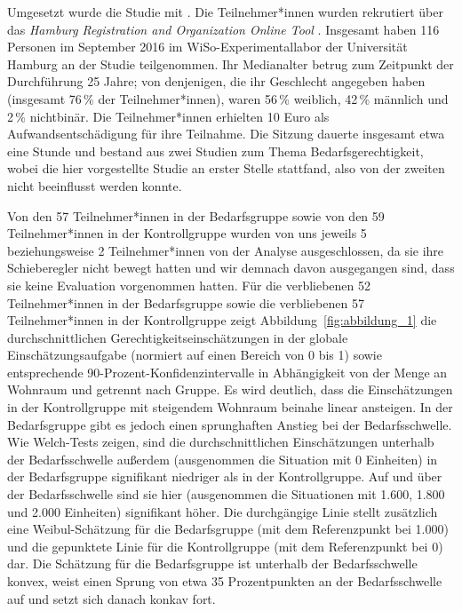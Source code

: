 \documentclass[justified,nobib,nohyper,symmetric,twoside]{tufte-book}
\begin{document}
Umgesetzt wurde die Studie mit \citet{limesurvey_limesurvey_2020}.
Die Teilnehmer*innen wurden rekrutiert über das \textit{Hamburg Registration and Organization Online Tool} \citep{bock_hroot_2014}.
Insgesamt haben 116 Personen im September 2016 im WiSo-Experimentallabor der Universität Hamburg an der Studie teilgenommen.
Ihr Medianalter betrug zum Zeitpunkt der Durchführung 25 Jahre; von denjenigen, die ihr Geschlecht angegeben haben (insgesamt 76\,\% der Teilnehmer*innen), waren 56\,\% weiblich, 42\,\% männlich und 2\,\% nichtbinär.
Die Teilnehmer*innen erhielten 10 Euro als Aufwandsentschädigung für ihre Teilnahme.
Die Sitzung dauerte insgesamt etwa eine Stunde und bestand aus zwei Studien zum Thema Bedarfsgerechtigkeit, wobei die hier vorgestellte Studie an erster Stelle stattfand, also von der zweiten nicht beeinflusst werden konnte.

Von den 57 Teilnehmer*innen in der Bedarfsgruppe sowie von den 59 Teilnehmer*innen in der Kontrollgruppe wurden von uns jeweils 5 beziehungsweise 2 Teilnehmer*innen von der Analyse ausgeschlossen, da sie ihre Schieberegler nicht bewegt hatten und wir demnach davon ausgegangen sind, dass sie keine Evaluation vorgenommen hatten.
Für die verbliebenen 52 Teilnehmer*innen in der Bedarfsgruppe sowie die verbliebenen 57 Teilnehmer*innen in der Kontrollgruppe zeigt Abbildung~\ref{fig:abbildung_1} die durchschnittlichen Gerechtigkeitseinschätzungen in der globale Einschätzungsaufgabe (normiert auf einen Bereich von 0 bis 1) sowie entsprechende 90-Prozent-Konfidenzintervalle in Abhängigkeit von der Menge an Wohnraum und getrennt nach Gruppe.
Es wird deutlich, dass die Einschätzungen in der Kontrollgruppe mit steigendem Wohnraum beinahe linear ansteigen.
In der Bedarfsgruppe gibt es jedoch einen sprunghaften Anstieg bei der Bedarfsschwelle.
Wie Welch-Tests zeigen, sind die durchschnittlichen Einschätzungen unterhalb der Bedarfsschwelle außerdem (ausgenommen die Situation mit 0 Einheiten) in der Bedarfsgruppe signifikant niedriger als in der Kontrollgruppe.
Auf und über der Bedarfsschwelle sind sie hier (ausgenommen die Situationen mit 1.600, 1.800 und 2.000 Einheiten) signifikant höher.
Die durchgän\-gige Linie stellt zusätzlich eine Weibul-Schätzung für die Bedarfsgruppe (mit dem Referenzpunkt bei 1.000) und die gepunktete Linie für die Kontrollgruppe (mit dem Referenzpunkt bei 0) dar.
Die Schätzung für die Bedarfsgruppe ist unterhalb der Bedarfsschwelle konvex, weist einen Sprung von etwa 35 Prozentpunkten an der Bedarfsschwelle auf und setzt sich danach konkav fort.
\end{document}
